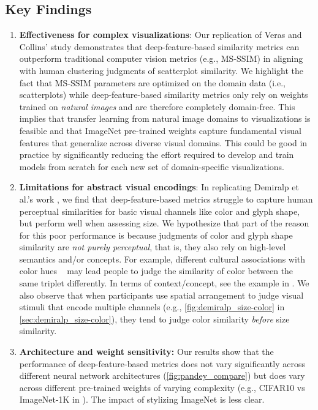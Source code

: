 \documentclass[sigconf]{acmart}
\begin{document}
\subsection{Key Findings}
\begin{enumerate}
    \item \textbf{Effectiveness for complex visualizations}: Our replication of Veras and Collins' study \cite{veras2019discriminability} demonstrates that deep-feature-based similarity metrics can outperform traditional computer vision metrics (e.g., MS-SSIM) in aligning with human clustering judgments of scatterplot similarity. We highlight the fact that MS-SSIM parameters are optimized on the domain data (i.e., scatterplots) while deep-feature-based similarity metrics only rely on weights trained on \textit{natural images} and are therefore completely domain-free. This implies that transfer learning from natural image domains to visualizations is feasible and that ImageNet pre-trained weights capture fundamental visual features that generalize across diverse visual domains. This could be good in practice by significantly reducing the effort required to develop and train models from scratch for each new set of domain-specific visualizations. 
    \item \textbf{Limitations for abstract visual encodings}: In replicating Demiralp et al.'s work \cite{demiralp2014learning}, we find that deep-feature-based metrics struggle to capture human perceptual similarities for basic visual channels like color and glyph shape, but perform well when assessing size. We hypothesize that part of the reason for this poor performance is because judgments of color and glyph shape similarity are \textit{not purely perceptual}, that is, they also rely on high-level semantics and/or concepts. For example, different cultural associations with color hues ~\cite{jacobs1991cross} may lead people to judge the similarity of color between the same triplet differently. In terms of context/concept, see the example in .
    We also observe that when participants use spatial arrangement to judge visual stimuli that encode multiple channels (e.g., \mbox{\cref{fig:demiralp_size-color}} in \mbox{\cref{sec:demiralp_size-color}}), they tend to judge color similarity \textit{before} size similarity.
    \item \textbf{Architecture and weight sensitivity:} Our results show that the performance of deep-feature-based metrics does not vary significantly across different neural network architectures (\cref{fig:pandey_compare}) but does vary across different pre-trained weights of varying complexity (e.g., CIFAR10 vs ImageNet-1K  in ). The impact of stylizing ImageNet is less clear. 
\end{enumerate}
\end{document}
